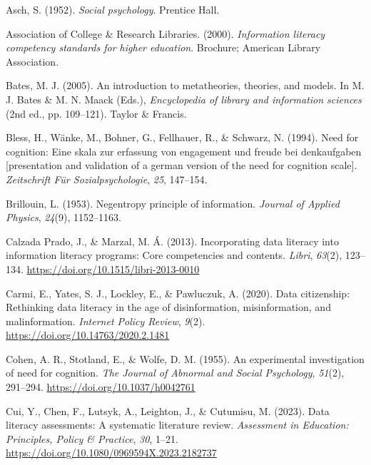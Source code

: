 \documentclass[
  12pt,
  a4paper,
  twoside]{article}
\newlength{\cslhangindent}
\newenvironment{CSLReferences}[2] %
 {\begin{list}{}{%
  \setlength{\itemindent}{0pt}
  \setlength{\leftmargin}{0pt}
  \setlength{\parsep}{0pt}
  \ifodd #1
   \setlength{\leftmargin}{\cslhangindent}
   \setlength{\itemindent}{-1\cslhangindent}
  \fi
  \setlength{\itemsep}{#2\baselineskip}}}
 {\end{list}}
\begin{document}
\label{refs}
\begin{CSLReferences}{1}{0}
Asch, S. (1952). \emph{Social psychology}. Prentice Hall.

Association of College \& Research Libraries. (2000). \emph{Information literacy competency standards for higher education}. Brochure; American Library Association.

Bates, M. J. (2005). An introduction to metatheories, theories, and models. In M. J. Bates \& M. N. Maack (Eds.), \emph{Encyclopedia of library and information sciences} (2nd ed., pp. 109--121). Taylor \& Francis.

Bless, H., Wänke, M., Bohner, G., Fellhauer, R., \& Schwarz, N. (1994). Need for cognition: Eine skala zur erfassung von engagement und freude bei denkaufgaben {[}presentation and validation of a german version of the need for cognition scale{]}. \emph{Zeitschrift Für Sozialpsychologie}, \emph{25}, 147--154.

Brillouin, L. (1953). Negentropy principle of information. \emph{Journal of Applied Physics}, \emph{24}(9), 1152--1163.

Calzada Prado, J., \& Marzal, M. Á. (2013). Incorporating data literacy into information literacy programs: Core competencies and contents. \emph{Libri}, \emph{63}(2), 123--134. \url{https://doi.org/10.1515/libri-2013-0010}

Carmi, E., Yates, S. J., Lockley, E., \& Pawluczuk, A. (2020). Data citizenship: Rethinking data literacy in the age of disinformation, misinformation, and malinformation. \emph{Internet Policy Review}, \emph{9}(2). \url{https://doi.org/10.14763/2020.2.1481}

Cohen, A. R., Stotland, E., \& Wolfe, D. M. (1955). An experimental investigation of need for cognition. \emph{The Journal of Abnormal and Social Psychology}, \emph{51}(2), 291--294. \url{https://doi.org/10.1037/h0042761}

Cui, Y., Chen, F., Lutsyk, A., Leighton, J., \& Cutumisu, M. (2023). Data literacy assessments: A systematic literature review. \emph{Assessment in Education: Principles, Policy \& Practice}, \emph{30}, 1--21. \url{https://doi.org/10.1080/0969594X.2023.2182737}


\end{CSLReferences}
\end{document}
